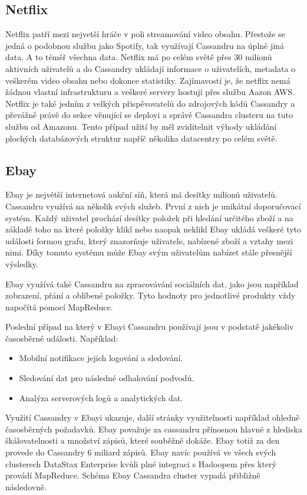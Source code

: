 \subsection{Netflix}
Netflix patří mezi nejvetší hráče v poli streamování video obsahu. Přestože se jedná o podobnou službu jako Spotify, tak využívají Cassandru na úplně jiná data. A to téměř všechna data. Netflix má po celém světě přes 30 milionů aktivních uživatelů a do Cassandry ukládají informace o uživatelích, metadata o veškerém video obsahu nebo dokonce statistiky. Zajímavostí je, že netflix nemá žádnou vlastní infrastrukturu a veškeré servery hostují přes službu Aazon AWS. Netflix je také jedním z velkých přispěvovatelů do zdrojových kódů Cassandry a převážně právě do sekce věnující se deployi a správě Cassandra clusteru na tuto službu od Amazonu. Tento případ užití by měl zviditelnit výhody ukládání plochých databázových struktur napříč několika datacentry po celém světě. 

\subsection{Ebay} 
Ebay je největší internetová aukční síň, která má desítky milionů uživatelů. Cassandru využívá na několik svých služeb. První z nich je unikátní doporučovací systém. Každý uživatel prochází desítky položek při hledání určitého zboží a na základě toho na které položky klikl nebo naopak neklikl Ebay ukládá veškeré tyto události formou grafu, který znazorňuje uživatele, nabízené zboží a vztahy mezi nimi. Díky tomuto systému může Ebay svým uživatelům nabízet stále přesnější výsledky. 

Ebay využívá také Cassandru na zpracovávání sociálních dat, jako jsou například zobrazení, přání a oblíbené položky. Tyto hodnoty pro jednotlivé produkty vždy napočítá pomocí MapReduce. 

Poslední případ na který v Ebayi Cassandru používají jsou v podstatě jakékoliv časosběrné události. Například:
\begin{itemize}
\item Mobilní notifikace jejich logování a sledování.
\item Sledování dat pro následné odhalování podvodů.
\item Analýza serverových logů a analytických dat.
\end{itemize}

Využití Cassandry v Ebayi ukazuje, další stránky využitelnosti například ohledně časosběrných požadavků. Ebay považuje za cassandru přínosnou hlavně z hlediska škálovatelnosti a množství zápisů, které souběžně dokáže. Ebay totiž za den provede do Cassandry 6 miliard zápisů.\cite{ebay} Ebay navíc používá ve všech svých clusterech DataStax Enterprise kvůli plné integraci s Hadoopem přes který provádí MapReduce. Schéma Ebay Cassandra cluster vypadá přibližně následovně.

